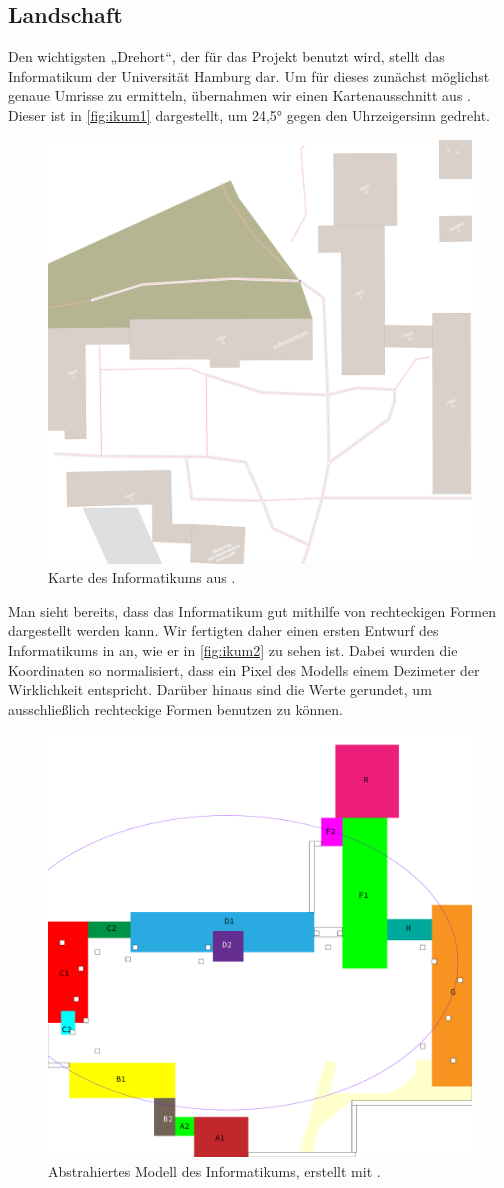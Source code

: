 \subsection{Landschaft}

Den wichtigsten „Drehort“, der für das Projekt benutzt wird, stellt das Informatikum der Universität Hamburg dar. Um für dieses zunächst möglichst genaue Umrisse zu ermitteln, übernahmen wir einen Kartenausschnitt aus \OSM. Dieser ist in \autoref{fig:ikum1} dargestellt, um 24,5° gegen den Uhrzeigersinn gedreht.

\begin{figure}[h]
	\centering
	\includegraphics[width=0.35\linewidth]{Informatikum/Informatikum1}
	\caption{Karte des Informatikums aus \OSM.}
	\label{fig:ikum1}
\end{figure}

Man sieht bereits, dass das Informatikum gut mithilfe von rechteckigen Formen dargestellt werden kann. Wir fertigten daher einen ersten Entwurf des Informatikums in \Illustrator an, wie er in \autoref{fig:ikum2} zu sehen ist. Dabei wurden die Koordinaten so normalisiert, dass ein Pixel des Modells einem Dezimeter der Wirklichkeit entspricht. Darüber hinaus sind die Werte gerundet, um ausschließlich rechteckige Formen benutzen zu können.

\begin{figure}[h]
	\centering
	\includegraphics[width=0.35\linewidth]{Informatikum/Informatikum2}
	\caption{Abstrahiertes Modell des Informatikums, erstellt mit \Illustrator.}
	\label{fig:ikum2}
\end{figure}


